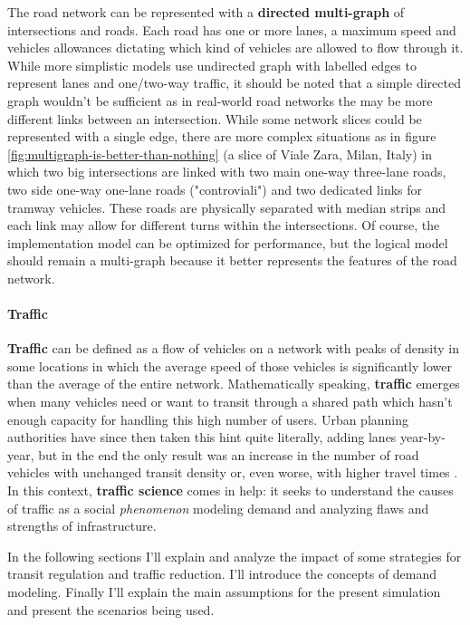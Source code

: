 The road network can be represented with a \textbf{directed multi-graph} of intersections and roads. Each road has one or more lanes, a maximum speed and vehicles allowances dictating which kind of vehicles are allowed to flow through it. While more simplistic models use undirected graph with labelled edges to represent lanes and one/two-way traffic, it should be noted that a simple directed graph wouldn't be sufficient as in real-world road networks the may be more different links between an intersection. While some network slices could be represented with a single edge, there are more complex situations as in figure \ref{fig:multigraph-is-better-than-nothing} (a slice of Viale Zara, Milan, Italy) in which two big intersections are linked with two main one-way three-lane roads, two side one-way one-lane roads ("controviali") and two dedicated links for tramway vehicles. These roads are physically separated with median strips and each link may allow for different turns within the intersections. Of course, the implementation model can be optimized for performance, but the logical model should remain a multi-graph because it better represents the features of the road network.

\paragraph{Traffic}

\textbf{Traffic} can be defined as a flow of vehicles on a network with peaks of density in some locations in which the average speed of those vehicles is significantly lower than the average of the entire network.
Mathematically speaking, \textbf{traffic} emerges when many vehicles need or want to transit through a shared path which hasn't enough capacity for handling this high number of users.
Urban planning authorities have since then taken this hint quite literally, adding lanes year-by-year, but in the end the only result was an increase in the number of road vehicles with unchanged transit density or, even worse, with higher travel times \cite{Speck2018}.
In this context, \textbf{traffic science} comes in help: it seeks to understand the causes of traffic as a social \textit{phenomenon} modeling demand and analyzing flaws and strengths of infrastructure.

In the following sections I'll explain and analyze the impact of some strategies for transit regulation and traffic reduction. I'll introduce the concepts of demand modeling. Finally I'll explain the main assumptions for the present simulation and present the scenarios being used.

